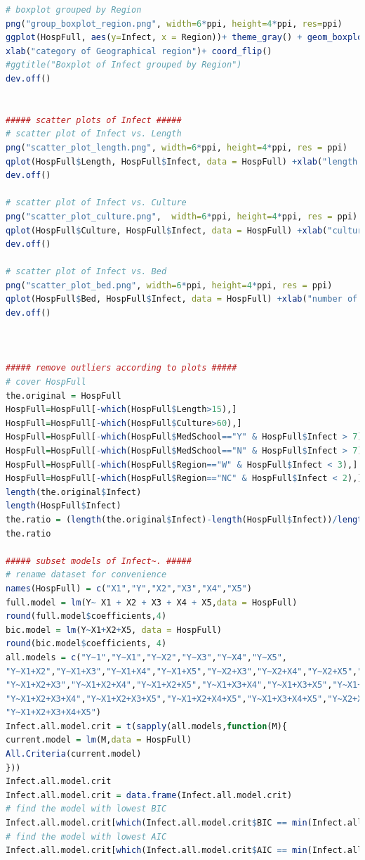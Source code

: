 \documentclass[a4paper,11pt,onecolumn,twoside]{article}
\begin{document}
\begin{lstlisting}[language=R,caption={R script for Project 1}]
# boxplot grouped by Region
png("group_boxplot_region.png", width=6*ppi, height=4*ppi, res=ppi)
ggplot(HospFull, aes(y=Infect, x = Region))+ theme_gray() + geom_boxplot() + ylab("Probability of acquiring infection in hospital") + 
xlab("category of Geographical region")+ coord_flip() 
#ggtitle("Boxplot of Infect grouped by Region") 
dev.off()


##### scatter plots of Infect #####
# scatter plot of Infect vs. Length
png("scatter_plot_length.png", width=6*ppi, height=4*ppi, res = ppi)
qplot(HospFull$Length, HospFull$Infect, data = HospFull) +xlab("length of stay") + ylab("probability of acquiring infection")
dev.off()

# scatter plot of Infect vs. Culture
png("scatter_plot_culture.png",  width=6*ppi, height=4*ppi, res = ppi)
qplot(HospFull$Culture, HospFull$Infect, data = HospFull) +xlab("culture/patients * 100") + ylab("probability of acquiring infection")
dev.off()

# scatter plot of Infect vs. Bed
png("scatter_plot_bed.png", width=6*ppi, height=4*ppi, res = ppi)
qplot(HospFull$Bed, HospFull$Infect, data = HospFull) +xlab("number of beds") + ylab("probability of acquiring infection")
dev.off()



##### remove outliers according to plots #####
# cover HospFull
the.original = HospFull
HospFull=HospFull[-which(HospFull$Length>15),]
HospFull=HospFull[-which(HospFull$Culture>60),]
HospFull=HospFull[-which(HospFull$MedSchool=="Y" & HospFull$Infect > 7),]
HospFull=HospFull[-which(HospFull$MedSchool=="N" & HospFull$Infect > 7),]
HospFull=HospFull[-which(HospFull$Region=="W" & HospFull$Infect < 3),]
HospFull=HospFull[-which(HospFull$Region=="NC" & HospFull$Infect < 2),]
length(the.original$Infect)
length(HospFull$Infect)
the.ratio = (length(the.original$Infect)-length(HospFull$Infect))/length(the.original$Infect)
the.ratio

##### subset models of Infect~. #####
# rename dataset for convenience
names(HospFull) = c("X1","Y","X2","X3","X4","X5")
full.model = lm(Y~ X1 + X2 + X3 + X4 + X5,data = HospFull)
round(full.model$coefficients,4)
bic.model = lm(Y~X1+X2+X5, data = HospFull)
round(bic.model$coefficients, 4)
all.models = c("Y~1","Y~X1","Y~X2","Y~X3","Y~X4","Y~X5",
"Y~X1+X2","Y~X1+X3","Y~X1+X4","Y~X1+X5","Y~X2+X3","Y~X2+X4","Y~X2+X5","Y~X3+X4","Y~X3+X5","Y~X4+X5",
"Y~X1+X2+X3","Y~X1+X2+X4","Y~X1+X2+X5","Y~X1+X3+X4","Y~X1+X3+X5","Y~X1+X4+X5","Y~X2+X3+X4","Y~X2+X3+X5","Y~X2+X4+X5","Y~X3+X4+X5",
"Y~X1+X2+X3+X4","Y~X1+X2+X3+X5","Y~X1+X2+X4+X5","Y~X1+X3+X4+X5","Y~X2+X3+X4+X5",
"Y~X1+X2+X3+X4+X5")
Infect.all.model.crit = t(sapply(all.models,function(M){
current.model = lm(M,data = HospFull)
All.Criteria(current.model)
}))
Infect.all.model.crit
Infect.all.model.crit = data.frame(Infect.all.model.crit)
# find the model with lowest BIC
Infect.all.model.crit[which(Infect.all.model.crit$BIC == min(Infect.all.model.crit[,5])),]
# find the model with lowest AIC
Infect.all.model.crit[which(Infect.all.model.crit$AIC == min(Infect.all.model.crit[,4])),]



\end{lstlisting}
\end{document}

